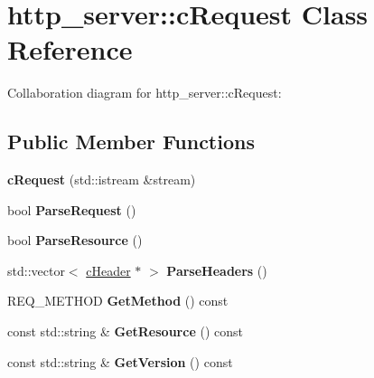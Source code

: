 \hypertarget{classhttp__server_1_1cRequest}{\section{http\-\_\-server\-:\-:c\-Request Class Reference}
\label{classhttp__server_1_1cRequest}
}


Collaboration diagram for http\-\_\-server\-:\-:c\-Request\-:
\subsection*{Public Member Functions}
\begin{DoxyCompactItemize}
\item 
\hypertarget{classhttp__server_1_1cRequest_aa3cadbdda5c1ad42a29f182bddc94fb1}{{\bfseries c\-Request} (std\-::istream \&stream)}\label{classhttp__server_1_1cRequest_aa3cadbdda5c1ad42a29f182bddc94fb1}

\item 
\hypertarget{classhttp__server_1_1cRequest_ac9531a813f05222ee24c7a27d2ec90fd}{bool {\bfseries Parse\-Request} ()}\label{classhttp__server_1_1cRequest_ac9531a813f05222ee24c7a27d2ec90fd}

\item 
\hypertarget{classhttp__server_1_1cRequest_ab623c396e4dbde0253c99c0a609f275f}{bool {\bfseries Parse\-Resource} ()}\label{classhttp__server_1_1cRequest_ab623c396e4dbde0253c99c0a609f275f}

\item 
\hypertarget{classhttp__server_1_1cRequest_a4526de1f0c6af63f325b540fa763330b}{std\-::vector$<$ \hyperlink{classhttp__server_1_1cHeader}{c\-Header} $\ast$ $>$ {\bfseries Parse\-Headers} ()}\label{classhttp__server_1_1cRequest_a4526de1f0c6af63f325b540fa763330b}

\item 
\hypertarget{classhttp__server_1_1cRequest_af0c3d838c88fef758115eda75cd66835}{R\-E\-Q\-\_\-\-M\-E\-T\-H\-O\-D {\bfseries Get\-Method} () const }\label{classhttp__server_1_1cRequest_af0c3d838c88fef758115eda75cd66835}

\item 
\hypertarget{classhttp__server_1_1cRequest_a808d2f736c751db6d111d2cbb2458470}{const std\-::string \& {\bfseries Get\-Resource} () const }\label{classhttp__server_1_1cRequest_a808d2f736c751db6d111d2cbb2458470}

\item 
\hypertarget{classhttp__server_1_1cRequest_a9f1fbe83f22a917f75085326b96a5577}{const std\-::string \& {\bfseries Get\-Version} () const }\label{classhttp__server_1_1cRequest_a9f1fbe83f22a917f75085326b96a5577}


\end{DoxyCompactItemize}
